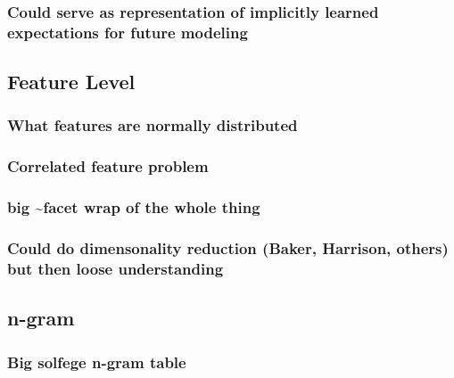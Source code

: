 \documentclass[]{book}
\theoremstyle{definition}
\theoremstyle{definition}
\theoremstyle{definition}
\theoremstyle{remark}
\begin{document}
\hypertarget{could-serve-as-representation-of-implicitly-learned-expectations-for-future-modeling}{%
\subsubsection{Could serve as representation of implicitly learned
expectations for future
modeling}\label{could-serve-as-representation-of-implicitly-learned-expectations-for-future-modeling}}

\hypertarget{feature-level}{%
\subsection{Feature Level}\label{feature-level}}

\hypertarget{what-features-are-normally-distributed}{%
\subsubsection{What features are normally
distributed}\label{what-features-are-normally-distributed}}

\hypertarget{correlated-feature-problem}{%
\subsubsection{Correlated feature
problem}\label{correlated-feature-problem}}

\hypertarget{big-facet-wrap-of-the-whole-thing}{%
\subsubsection{big \textasciitilde{}facet wrap of the whole
thing}\label{big-facet-wrap-of-the-whole-thing}}

\hypertarget{could-do-dimensonality-reduction-baker-harrison-others-but-then-loose-understanding}{%
\subsubsection{Could do dimensonality reduction (Baker, Harrison,
others) but then loose
understanding}\label{could-do-dimensonality-reduction-baker-harrison-others-but-then-loose-understanding}}

\hypertarget{n-gram}{%
\subsection{n-gram}\label{n-gram}}

\hypertarget{big-solfege-n-gram-table}{%
\subsubsection{Big solfege n-gram
table}\label{big-solfege-n-gram-table}}
\end{document}
